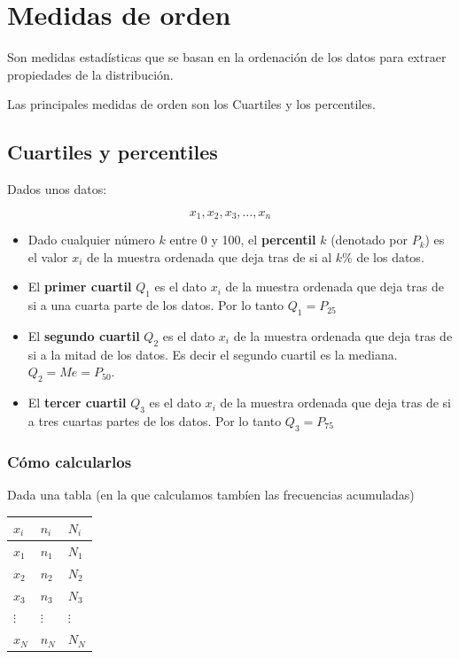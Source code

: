 \documentclass[
]{article}
\providecommand{\tightlist}{%
  \setlength{\itemsep}{0pt}\setlength{\parskip}{0pt}}
\begin{document}
\hypertarget{medidas-de-orden}{%
\section{Medidas de orden}\label{medidas-de-orden}}

Son medidas estadísticas que se basan en la ordenación de los datos para
extraer propiedades de la distribución.

Las principales medidas de orden son los Cuartiles y los percentiles.

\hypertarget{cuartiles-y-percentiles}{%
\subsection{Cuartiles y percentiles}\label{cuartiles-y-percentiles}}

Dados unos datos:

\[x_1, x_2, x_3,\ldots , x_n\]

\begin{itemize}
\tightlist
\item
  Dado cualquier número \(k\) entre 0 y 100, el \textbf{percentil} \(k\)
  (denotado por \(P_k\)) es el valor \(x_i\) de la muestra ordenada que
  deja tras de si al \(k\%\) de los datos.
\item
  El \textbf{primer cuartil} \(Q_1\) es el dato \(x_i\) de la muestra
  ordenada que deja tras de si a una cuarta parte de los datos. Por lo
  tanto \(Q_1 = P_{25}\)
\item
  El \textbf{segundo cuartil} \(Q_2\) es el dato \(x_i\) de la muestra
  ordenada que deja tras de si a la mitad de los datos. Es decir el
  segundo cuartil es la mediana. \(Q_2 = Me = P_{50}\).
\item
  El \textbf{tercer cuartil} \(Q_3\) es el dato \(x_i\) de la muestra
  ordenada que deja tras de si a tres cuartas partes de los datos. Por
  lo tanto \(Q_3 = P_{75}\)
\end{itemize}

\hypertarget{cuxf3mo-calcularlos}{%
\subsubsection{Cómo calcularlos}\label{cuxf3mo-calcularlos}}

Dada una tabla (en la que calculamos tambíen las frecuencias acumuladas)

\begin{longtable}[]{@{}lll@{}}
\toprule
\(x_i\) & \(n_i\) & \(N_i\)\tabularnewline
\midrule
\endhead
\(x_1\) & \(n_1\) & \(N_1\)\tabularnewline
\(x_2\) & \(n_2\) & \(N_2\)\tabularnewline
\(x_3\) & \(n_3\) & \(N_3\)\tabularnewline
\(\vdots\) & \(\vdots\) & \(\vdots\)\tabularnewline
\(x_N\) & \(n_N\) & \(N_N\)\tabularnewline
\bottomrule
\end{longtable}
\end{document}
